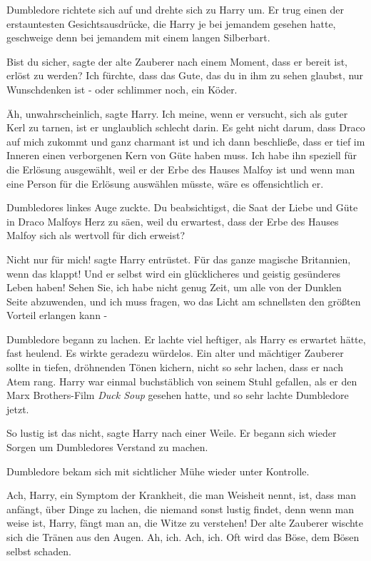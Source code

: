 Dumbledore richtete sich auf und drehte sich zu Harry um. Er trug einen der
erstauntesten Gesichtsausdrücke, die Harry je bei jemandem gesehen hatte,
geschweige denn bei jemandem mit einem langen Silberbart.

\glqq{}Bist du sicher\grqq{}, sagte der alte Zauberer nach einem Moment, \glqq{}
dass er bereit ist, erlöst zu werden? Ich fürchte, dass das Gute, das du in ihm
zu sehen glaubst, nur Wunschdenken ist - oder schlimmer noch, ein Köder.\grqq{}

\glqq{}Äh, unwahrscheinlich\grqq{}, sagte Harry. \glqq{}Ich meine, wenn er
versucht, sich als guter Kerl zu tarnen, ist er unglaublich schlecht darin. Es
geht nicht darum, dass Draco auf mich zukommt und ganz charmant ist und ich dann
beschließe, dass er tief im Inneren einen verborgenen Kern von Güte haben muss.
Ich habe ihn speziell für die Erlösung ausgewählt, weil er der Erbe des Hauses
Malfoy ist und wenn man eine Person für die Erlösung auswählen müsste, wäre es
offensichtlich er.\grqq{}

Dumbledores linkes Auge zuckte. \glqq{}Du beabsichtigst, die Saat der Liebe und
Güte in Draco Malfoys Herz zu säen, weil du erwartest, dass der Erbe des Hauses
Malfoy sich als wertvoll für dich erweist?\grqq{}

\glqq{}Nicht nur für mich!\grqq{} sagte Harry entrüstet. \glqq{}Für das ganze
magische Britannien, wenn das klappt! Und er selbst wird ein glücklicheres und
geistig gesünderes Leben haben! Sehen Sie, ich habe nicht genug Zeit, um alle
von der Dunklen Seite abzuwenden, und ich muss fragen, wo das Licht am
schnellsten den größten Vorteil erlangen kann -\grqq{}

Dumbledore begann zu lachen. Er lachte viel heftiger, als Harry es erwartet
hätte, fast heulend. Es wirkte geradezu würdelos. Ein alter und mächtiger
Zauberer sollte in tiefen, dröhnenden Tönen kichern, nicht so sehr lachen, dass
er nach Atem rang. Harry war einmal buchstäblich von seinem Stuhl gefallen, als
er den Marx Brothers-Film \emph{Duck Soup} gesehen hatte, und so sehr lachte
Dumbledore jetzt.

\glqq{}So lustig ist das nicht\grqq{}, sagte Harry nach einer Weile. Er begann
sich wieder Sorgen um Dumbledores Verstand zu machen.

Dumbledore bekam sich mit sichtlicher Mühe wieder unter Kontrolle.

\glqq{}Ach, Harry, ein Symptom der Krankheit, die man Weisheit nennt, ist, dass
man anfängt, über Dinge zu lachen, die niemand sonst lustig findet, denn wenn
man weise ist, Harry, fängt man an, die Witze zu verstehen!\grqq{} Der alte
Zauberer wischte sich die Tränen aus den Augen. \glqq{}Ah, ich. Ach, ich. Oft
wird das Böse, dem Bösen selbst schaden.\grqq{}

